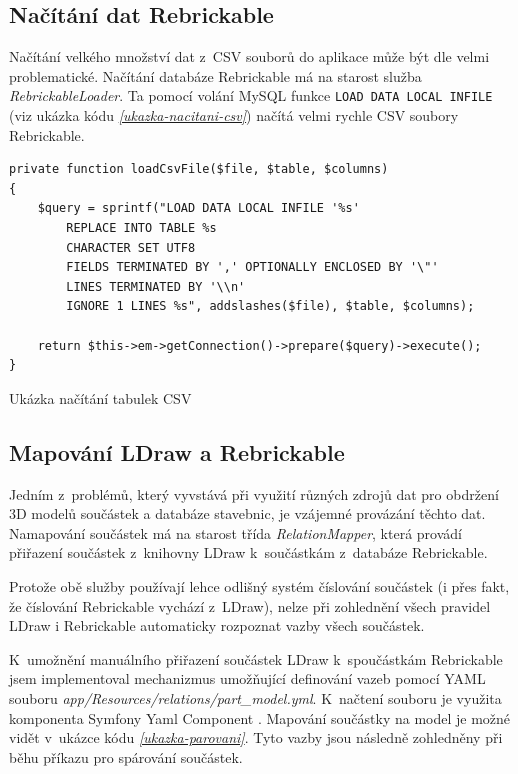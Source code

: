 \subsection{Načítání dat Rebrickable}\label{nacitani-rebrickable}
Načítání velkého množství dat z~CSV souborů do aplikace může být dle \autocite{grok} velmi problematické. Načítání databáze Rebrickable má na starost služba \textit{RebrickableLoader}. Ta pomocí volání MySQL funkce \texttt{LOAD DATA LOCAL INFILE} (viz ukázka kódu \emph{\ref{ukazka-nacitani-csv}}) načítá velmi rychle CSV soubory Rebrickable.

\begin{listing}[htbp]
        \begin{verbatim}
private function loadCsvFile($file, $table, $columns)
{
    $query = sprintf("LOAD DATA LOCAL INFILE '%s' 
        REPLACE INTO TABLE %s
        CHARACTER SET UTF8
        FIELDS TERMINATED BY ',' OPTIONALLY ENCLOSED BY '\"'
        LINES TERMINATED BY '\\n'
        IGNORE 1 LINES %s", addslashes($file), $table, $columns);

    return $this->em->getConnection()->prepare($query)->execute();
}
        \end{verbatim}
    \caption{Ukázka načítání tabulek CSV \label{ukazka-nacitani-csv}}
\end{listing}

\subsection{Mapování LDraw a Rebrickable}
Jedním z~problémů, který vyvstává při využití různých zdrojů dat pro obdržení 3D modelů součástek a databáze stavebnic, je vzájemné provázání těchto dat. Namapování součástek má na starost třída \textit{RelationMapper}, která provádí přiřazení součástek z~knihovny LDraw k~součástkám z~databáze Rebrickable. 

Protože obě služby používají lehce odlišný systém číslování součástek (i přes fakt, že číslování Rebrickable vychází z~LDraw), nelze při zohlednění všech pravidel LDraw \autocite{ldraw:numbering:faq} i Rebrickable \autocite{rebrickable:numbering:changes} automaticky rozpoznat vazby všech součástek.

K~umožnění manuálního přiřazení součástek LDraw k~spoučástkám Rebrickable jsem implementoval mechanizmus umožňující definování vazeb pomocí \gls{YAML} souboru \textit{app/Resources/relations/part\_model.yml}. K~načtení souboru je využita komponenta Symfony Yaml Component \autocite{symfony:yaml}. Mapování součástky na model je možné vidět v~ukázce kódu \emph{\ref{ukazka-parovani}}. Tyto vazby jsou následně zohledněny při běhu příkazu pro spárování součástek.

